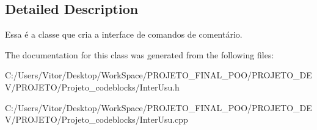 \subsection{Detailed Description}
Essa é a classe que cria a interface de comandos de comentário. 

The documentation for this class was generated from the following files\-:\begin{DoxyCompactItemize}
\item 
C\-:/\-Users/\-Vitor/\-Desktop/\-Work\-Space/\-P\-R\-O\-J\-E\-T\-O\-\_\-\-F\-I\-N\-A\-L\-\_\-\-P\-O\-O/\-P\-R\-O\-J\-E\-T\-O\-\_\-\-D\-E\-V/\-P\-R\-O\-J\-E\-T\-O/\-Projeto\-\_\-codeblocks/Inter\-Usu.\-h\item 
C\-:/\-Users/\-Vitor/\-Desktop/\-Work\-Space/\-P\-R\-O\-J\-E\-T\-O\-\_\-\-F\-I\-N\-A\-L\-\_\-\-P\-O\-O/\-P\-R\-O\-J\-E\-T\-O\-\_\-\-D\-E\-V/\-P\-R\-O\-J\-E\-T\-O/\-Projeto\-\_\-codeblocks/Inter\-Usu.\-cpp\end{DoxyCompactItemize}
